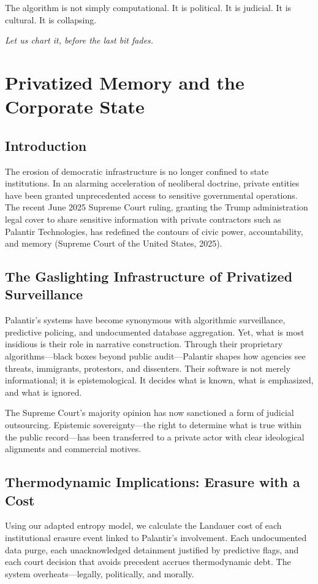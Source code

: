 The algorithm is not simply computational. It is political. It is judicial. It is cultural. It is collapsing.

\begin{flushright}
\textit{Let us chart it, before the last bit fades.}
\end{flushright}

\newpage

\chapter{Privatized Memory and the Corporate State}

\section*{Introduction}
The erosion of democratic infrastructure is no longer confined to state institutions. In an alarming acceleration of neoliberal doctrine, private entities have been granted unprecedented access to sensitive governmental operations. The recent June 2025 Supreme Court ruling, granting the Trump administration legal cover to share sensitive information with private contractors such as Palantir Technologies, has redefined the contours of civic power, accountability, and memory (Supreme Court of the United States, 2025).

\section{The Gaslighting Infrastructure of Privatized Surveillance}
Palantir’s systems have become synonymous with algorithmic surveillance, predictive policing, and undocumented database aggregation. Yet, what is most insidious is their role in narrative construction. Through their proprietary algorithms—black boxes beyond public audit—Palantir shapes how agencies see threats, immigrants, protestors, and dissenters. Their software is not merely informational; it is epistemological. It decides what is known, what is emphasized, and what is ignored.

The Supreme Court’s majority opinion has now sanctioned a form of judicial outsourcing. Epistemic sovereignty—the right to determine what is true within the public record—has been transferred to a private actor with clear ideological alignments and commercial motives.

\section{Thermodynamic Implications: Erasure with a Cost}
Using our adapted entropy model, we calculate the Landauer cost of each institutional erasure event linked to Palantir’s involvement. Each undocumented data purge, each unacknowledged detainment justified by predictive flags, and each court decision that avoids precedent accrues thermodynamic debt. The system overheats—legally, politically, and morally.

